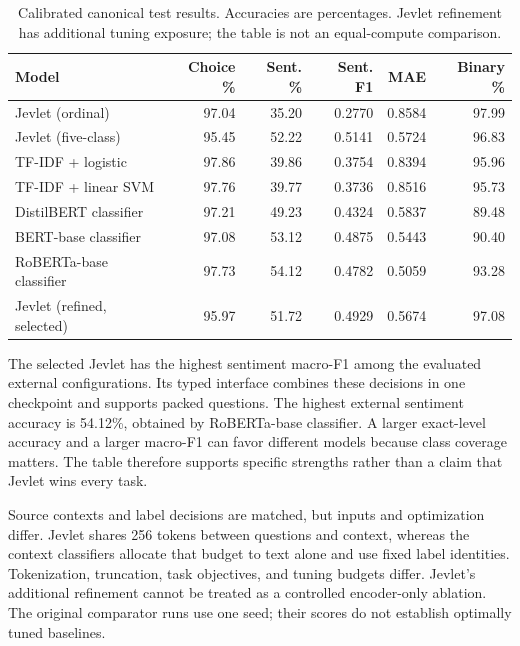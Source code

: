 \documentclass[conference]{IEEEtran}
\begin{document}
\begin{table}[t]
\caption{Calibrated canonical test results. Accuracies are percentages. Jevlet refinement has additional tuning exposure; the table is not an equal-compute comparison.}
\label{tab:comparison}\centering\footnotesize\setlength{\tabcolsep}{3pt}
\begin{tabular}{lrrrrr}\toprule
Model & Choice \% & Sent. \% & Sent. F1 & MAE & Binary \%\\\midrule
Jevlet (ordinal) & 97.04 & 35.20 & 0.2770 & 0.8584 & 97.99 \\
Jevlet (five-class) & 95.45 & 52.22 & 0.5141 & 0.5724 & 96.83 \\
TF-IDF + logistic & 97.86 & 39.86 & 0.3754 & 0.8394 & 95.96 \\
TF-IDF + linear SVM & 97.76 & 39.77 & 0.3736 & 0.8516 & 95.73 \\
DistilBERT classifier & 97.21 & 49.23 & 0.4324 & 0.5837 & 89.48 \\
BERT-base classifier & 97.08 & 53.12 & 0.4875 & 0.5443 & 90.40 \\
RoBERTa-base classifier & 97.73 & 54.12 & 0.4782 & 0.5059 & 93.28 \\
Jevlet (refined, selected) & 95.97 & 51.72 & 0.4929 & 0.5674 & 97.08 \\
\bottomrule\end{tabular}\end{table}

The selected Jevlet has the highest sentiment macro-F1 among the evaluated external configurations. Its typed interface combines these decisions in one checkpoint and supports packed questions. The highest external sentiment accuracy is 54.12\%, obtained by RoBERTa-base classifier. A larger exact-level accuracy and a larger macro-F1 can favor different models because class coverage matters. The table therefore supports specific strengths rather than a claim that Jevlet wins every task.

Source contexts and label decisions are matched, but inputs and optimization differ. Jevlet shares 256 tokens between questions and context, whereas the context classifiers allocate that budget to text alone and use fixed label identities. Tokenization, truncation, task objectives, and tuning budgets differ. Jevlet's additional refinement cannot be treated as a controlled encoder-only ablation. The original comparator runs use one seed; their scores do not establish optimally tuned baselines.
\end{document}
